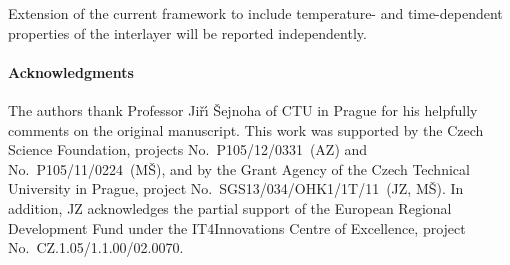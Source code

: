 \documentclass[11pt]{article}
\begin{document}
Extension of the current framework to include temperature- and time-dependent
properties of the interlayer will be reported independently.

\paragraph{Acknowledgments}
The authors thank Professor Ji\v{r}\'{\i} \v{S}ejnoha of CTU in Prague
for his helpfully comments on the original manuscript. This work was supported by
the Czech Science Foundation, projects No.~P105/12/0331~(AZ) and
No.~P105/11/0224~(M\v{S}), and by the Grant Agency of the Czech Technical
University in Prague, project No.~SGS13/034/OHK1/1T/11~(JZ, M\v{S}). In
addition, JZ acknowledges the partial support of the European Regional
Development Fund under the IT4Innovations Centre of Excellence, project
No.~CZ.1.05/1.1.00/02.0070.

\providecommand{\bysame}{\leavevmode\hbox to3em{\hrulefill}\thinspace}
\end{document}
